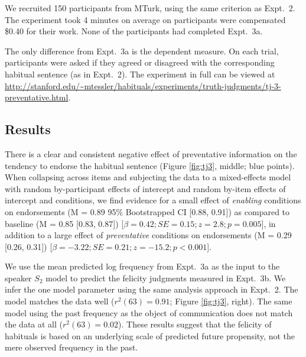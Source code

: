 \documentclass[10pt,letterpaper]{article}
\newcommand{\mht}[1]{\textcolor{DarkOrange}{[mht: #1]}}
\begin{document}

We recruited 150 participants from MTurk, using the same criterion as Expt.~2.
The experiment took 4 minutes on average on participants were compensated \$0.40 for their work.
None of the participants had completed Expt.~3a.

The only difference from Expt.~3a is the dependent measure. 
On each trial, participants were asked if they agreed or disagreed with the corresponding habitual sentence (as in Expt.~2).
The experiment in full can be viewed at \url{http://stanford.edu/~mtessler/habituals/experiments/truth-judgments/tj-3-preventative.html}.

\vspace{-1.5ex}
\subsection{Results}

There is a clear and consistent negative effect of preventative information on the tendency to endorse the habitual sentence (Figure \ref{fig:tj3}, middle; blue points).
When collapsing across items and subjecting the data to a mixed-effects model with random by-participant effects of intercept and random by-item effects of intercept and conditions, we find evidence for a small effect of \emph{enabling} conditions on endorsements (M =  0.89 95\% Bootstrapped CI [0.88, 0.91]) as compared to baseline (M = 0.85 [0.83, 0.87]) [$\beta = 0.42; SE = 0.15; z = 2.8; p = 0.005$], in addition to a large effect of \emph{preventative} conditions on endorsements (M = 0.29 [0.26, 0.31]) [$ \beta = -3.22; SE = 0.21; z = -15.2; p < 0.001$]. 

We use the mean predicted log frequency from Expt.~3a as the input to the speaker $S_2$ model to predict the felicity judgments measured in Expt.~3b.
We infer the one model parameter using the same analysis approach in Expt.~2. 
The model matches the data well ($r^2(63) = 0.91$; Figure \ref{fig:tj3}, right).
The same model using the past frequency as the object of communication does not match the data at all ($r^2(63) = 0.02$).
These results suggest that the felicity of habituals is based on an underlying scale of predicted future propensity, not the mere observed frequency in the past.
\end{document}
